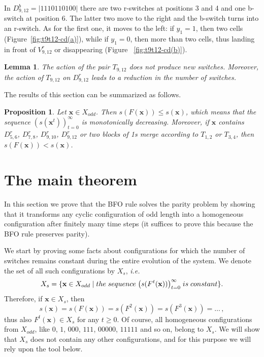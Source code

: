 \documentclass{sn-jnl}
\newtheorem{lem}{Lemma}%
\newtheorem{prop}{Proposition}%
\newcommand{\xodd}{X_{odd}}
\newcommand{\xconst}{X_{s}}
\newcommand{\bx}{\mathbf{x}}
\begin{document}
In $D_{9,12}^b=|1110110100|$ there are two r-switches at positions 3 and 4 and one b-switch at position 6. The latter two move to the right and the b-switch turns into an r-switch. As for the first one, it moves to the left: if $y_1=1$, then two cells (Figure~\ref{fig:t9t12-cd(a)}), while if $y_1=0$, then more than two cells, thus landing in front of $V_{9,12}^r$ or disappearing (Figure ~\ref{fig:t9t12-cd(b)}).

\begin{lem}\label{lem:t9t12}
The action of the pair $T_{9,12}$ does not produce new switches. Moreover, the action of $T_{9,12}$ on $D_{9,12}^r$ leads to a reduction in the number of switches.
\end{lem}

\bigskip
The results of this section can be summarized as follows.

\begin{prop}\label{thm:c}
Let $\bx\in \xodd$. Then $s(F(\bx))\leq s(\bx)$, which means that the sequence $(s(\bx^t))^\infty_{t=0}$ is monotonically decreasing. Moreover, if $\bx$ contains $D_{5,6}^r$, $D_{7,8}^r$, $D_{9,10}^r$, $D_{9,12}^r$ or two blocks of 1s merge according to $T_{1,2}$ or $T_{3,4}$, then $s(F(\bx))<s(\bx)$.
\end{prop}


\section{The main theorem}
\label{sec:main_theorem}
In this section we prove that the BFO rule solves the parity problem by showing that it transforms any cyclic configuration of odd length into a homogeneous configuration after finitely many time steps (it suffices to prove this because the BFO rule  preserves parity). 

We start by proving some facts about configurations for which the number of switches remains constant during the entire evolution of the system. We denote the set of all such configurations by $\xconst$, \emph{i.e.} 
\[
\xconst = \{ \bx\in \xodd \mid {\rm the\;  sequence\;} \big(s(F^t(\bx))\big)^\infty_{t=0}\; {\rm is\; constant} \}.
\]
Therefore, if $\bx\in \xconst$, then 
\[
s(\bx)=s(F(\bx))=s(F^2(\bx))=s(F^3(\bx))=\ldots\,,
\]
thus also $F^t(\bx)\in \xconst$ for any $t\geq 0$. Of course, all homogeneous configurations from $\xodd$, like $0$, $1$, $000$, $111$, $00000$, $11111$ and so on, belong to $\xconst$. We will show that $\xconst$ does not contain any other configurations, and for this purpose we will rely upon the tool below.
\end{document}

